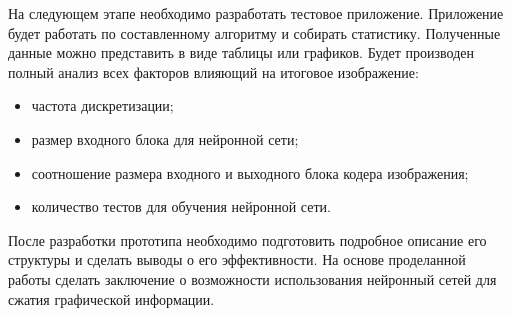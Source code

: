 На следующем этапе необходимо разработать тестовое приложение.
Приложение будет работать по составленному алгоритму и собирать статистику.
Полученные данные можно представить в виде таблицы или графиков.
Будет производен полный анализ всех факторов влияющий на итоговое изображение:
\begin{itemize}
  \item частота дискретизации;
  \item размер входного блока для нейронной сети;
  \item соотношение размера входного и выходного блока кодера изображения;
  \item количество тестов для обучения нейронной сети.
\end{itemize}

После разработки прототипа необходимо подготовить подробное описание его структуры и сделать выводы о его эффективности.
На основе проделанной работы сделать заключение о возможности использования нейронный сетей для сжатия графической информации.
